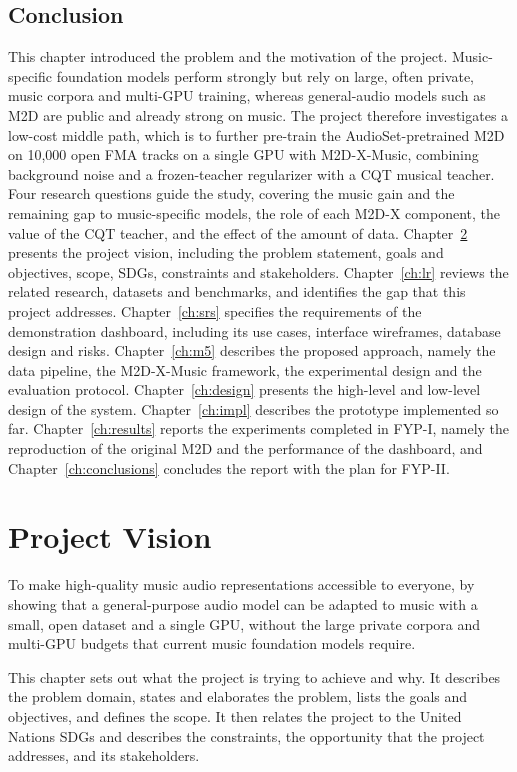 \documentclass{FastFyp}
\begin{document}
\section{Conclusion}
\label{sec:intro-conclusion}
This chapter introduced the problem and the motivation of the project. Music-specific foundation models perform strongly but rely on large, often private, music corpora and multi-GPU training, whereas general-audio models such as M2D are public and already strong on music. The project therefore investigates a low-cost middle path, which is to further pre-train the AudioSet-pretrained M2D on 10,000 open FMA tracks on a single GPU with M2D-X-Music, combining background noise and a frozen-teacher regularizer with a CQT musical teacher. Four research questions guide the study, covering the music gain and the remaining gap to music-specific models, the role of each M2D-X component, the value of the CQT teacher, and the effect of the amount of data. Chapter~\ref{ch:vision} presents the project vision, including the problem statement, goals and objectives, scope, SDGs, constraints and stakeholders. Chapter~\ref{ch:lr} reviews the related research, datasets and benchmarks, and identifies the gap that this project addresses. Chapter~\ref{ch:srs} specifies the requirements of the demonstration dashboard, including its use cases, interface wireframes, database design and risks. Chapter~\ref{ch:m5} describes the proposed approach, namely the data pipeline, the M2D-X-Music framework, the experimental design and the evaluation protocol. Chapter~\ref{ch:design} presents the high-level and low-level design of the system. Chapter~\ref{ch:impl} describes the prototype implemented so far. Chapter~\ref{ch:results} reports the experiments completed in FYP-I, namely the reproduction of the original M2D and the performance of the dashboard, and Chapter~\ref{ch:conclusions} concludes the report with the plan for FYP-II.

\chapter{Project Vision}
\label{ch:vision}
To make high-quality music audio representations accessible to everyone, by showing that a general-purpose audio model can be adapted to music with a small, open dataset and a single GPU, without the large private corpora and multi-GPU budgets that current music foundation models require.

This chapter sets out what the project is trying to achieve and why. It describes the problem domain, states and elaborates the problem, lists the goals and objectives, and defines the scope. It then relates the project to the United Nations SDGs and describes the constraints, the opportunity that the project addresses, and its stakeholders.
\end{document}
